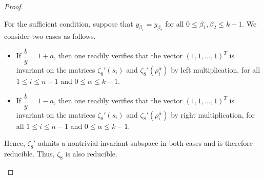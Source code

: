 \documentclass[preprint]{elsarticle}
\begin{document}
\begin{proof}
\begin{itemize}
For the sufficient condition, suppose that $y_{\beta_1}=y_{\beta_2}$ for all $0 \le \beta_1, \beta_2 \le k-1$. We consider two cases as follows.
\begin{itemize}
    \item[(i)] If $\dfrac{b}{y}=1+a$, then one readily verifies that the vector $(1,1,\ldots,1)^T$ is invariant on the matrices $\zeta_8'(s_i)$ and $\zeta_8'(\rho_i^{\alpha})$ by left multiplication, for all $1\leq i\leq n-1$ and $0\leq \alpha \leq k-1$.
    
    \item[(ii)] If $\dfrac{b}{y}=1-a$, then one readily verifies that the vector $(1,1,\ldots,1)^T$ is invariant on the matrices $\zeta_8'(s_i)$ and $\zeta_8'(\rho_i^{\alpha})$ by right multiplication, for all $1\leq i\leq n-1$ and $0\leq \alpha \leq k-1$.
\end{itemize}

Hence, $\zeta_8'$ admits a nontrivial invariant subspace in both cases and is therefore reducible. Thus, $\zeta_8$ is also reducible.
\end{itemize}
\end{proof}

\end{document}
